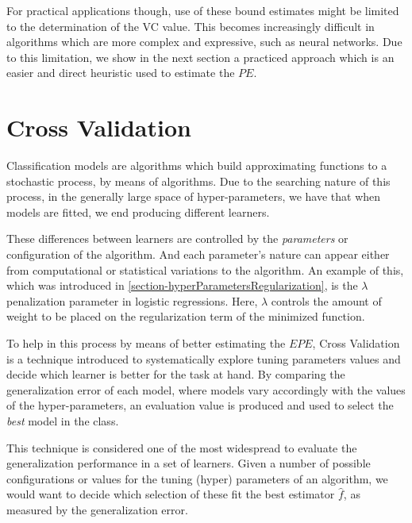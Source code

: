 For practical applications though, use of these bound estimates might be limited to the determination of the VC value. This becomes increasingly difficult in algorithms which are more complex and expressive, such as neural networks. 
Due to this limitation, we show in the next section a practiced approach which is an easier and direct heuristic used to estimate the $PE$.



\section{Cross Validation}\label{section:crossValidation}

Classification models are algorithms which build approximating functions to a stochastic process, by means of algorithms. Due to the searching nature of this process, in the generally large space of hyper-parameters, we have that when models are fitted, we end producing different learners. 
 
These differences between learners are controlled by the \textit{parameters} or configuration of the algorithm. 
And each parameter's nature can appear either from computational or statistical variations to the algorithm.
An example of this, which was introduced in \cref{section-hyperParametersRegularization}, is the $\lambda$ penalization parameter in logistic regressions. 
Here, $\lambda$ controls the amount of weight to be placed on the regularization term of the minimized function.

To help in this process by means of better estimating the $EPE$, Cross Validation is a technique introduced to systematically explore tuning parameters values and decide which learner is better for the task at hand. 
By comparing the generalization error of each model, where models vary accordingly with the values of the hyper-parameters, an evaluation value is produced and used to select the \textit{best} model in the class.

This technique is considered one of the most widespread to evaluate the generalization performance in a set of learners.
Given a number of possible configurations or values for the tuning (hyper) parameters of an algorithm, we would want to decide which selection of these fit the best estimator $\hat{f}$, as measured by the generalization error.

%

